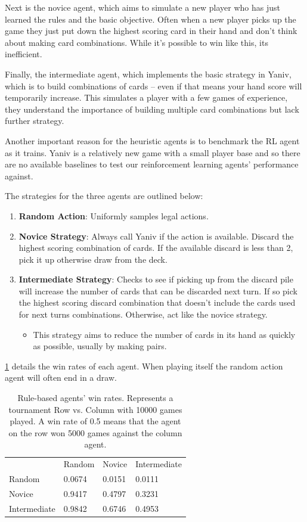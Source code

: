 \documentclass[../main.tex]{subfiles}
\begin{document}
Next is the novice agent, which aims to simulate a new player who has just learned the rules and the basic objective. Often when a new player picks up the game they just put down the highest scoring card in their hand and don't think about making card combinations. While it's possible to win like this, its inefficient.

Finally, the intermediate agent, which implements the basic strategy in Yaniv, which is to build combinations of cards -- even if that means your hand score will temporarily increase. This simulates a player with a few games of experience, they understand the importance of building multiple card combinations but lack further strategy. 

Another important reason for the heuristic agents is to benchmark the RL agent as it trains. Yaniv is a relatively new game with a small player base and so there are no available baselines to test our reinforcement learning agents' performance against.

The strategies for the three agents are outlined below:
\begin{enumerate}
    \item \textbf{Random Action}: Uniformly samples legal actions.
    \item \textbf{Novice Strategy}: Always call Yaniv if the action is available. Discard the highest scoring combination of cards. If the available discard is less than 2, pick it up otherwise draw from the deck. 
    \item \textbf{Intermediate Strategy}: Checks to see if picking up from the discard pile will increase the number of cards that can be discarded next turn. If so pick the highest scoring discard combination that doesn't include the cards used for next turns combinations. Otherwise, act like the novice strategy. 
    \begin{itemize}
        \item This strategy aims to reduce the number of cards in its hand as quickly as possible, usually by making pairs. 
    \end{itemize}
\end{enumerate}

\cref{tab:rules-winrates} details the win rates of each agent. When playing itself the random action agent will often end in a draw. 

\begin{table}[]
\centering
\begin{tabular}{@{}llll@{}}
             & Random & Novice & Intermediate \\
Random       & 0.0674 & 0.0151 & 0.0111       \\
Novice       & 0.9417 & 0.4797 & 0.3231       \\
Intermediate & 0.9842 & 0.6746 & 0.4953      
\end{tabular}
\caption{Rule-based agents' win rates. Represents a tournament Row vs. Column with 10000 games played. A win rate of 0.5 means that the agent on the row won 5000 games against the column agent.}
\label{tab:rules-winrates}
\end{table}
\end{document}

